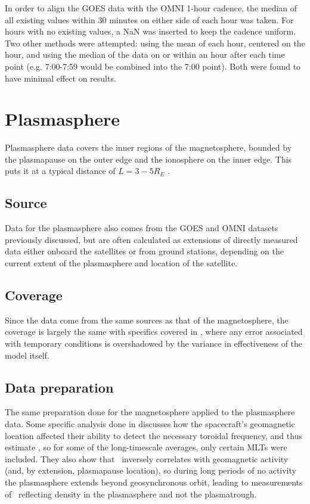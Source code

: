 In order to align the GOES data with the OMNI 1-hour cadence, the median of all existing values within 30 minutes on either side of each hour was taken. For hours with no existing values, a NaN was inserted to keep the cadence uniform. Two other methods were attempted: using the mean of each hour, centered on the hour, and using the median of the data on or within an hour after each time point (e.g. 7:00-7:59 would be combined into the 7:00 point). Both were found to have minimal effect on results.

\section{Plasmasphere}
Plasmasphere data covers the inner regions of the magnetosphere, bounded by the plasmapause on the outer edge and the ionosphere on the inner edge. This puts it at a typical distance of $L=3-5R_E$ \citep{Carpenter1992ISEEModel}. 

\subsection{Source}
Data for the plasmasphere also comes from the GOES and OMNI datasets previously discussed, but are often calculated as extensions of directly measured data either onboard the satellites or from ground stations, depending on the current extent of the plasmasphere and location of the satellite.

\subsection{Coverage}
Since the data come from the same sources as that of the magnetosphere, the coverage is largely the same with specifics covered in \cite{Takahashi2010SolarCycleVariation}, where any error associated with temporary conditions is overshadowed by the variance in effectiveness of the model itself. 

\subsection{Data preparation}
The same preparation done for the magnetosphere applied to the plasmasphere data.  Some specific analysis done in \cite{Takahashi2010SolarCycleVariation} discusses how the spacecraft's geomagnetic location affected their ability to detect the necessary toroidal frequency, and thus estimate \req, so for some of the long-timescale averages, only certain MLTs were included. They also show that \req\ inversely correlates with geomagnetic activity (and, by extension, plasmapause location), so during long periods of no activity the plasmasphere extends beyond geosynchronous orbit, leading to measurements of \req\ reflecting density in the plasmasphere and not the plasmatrough. 


